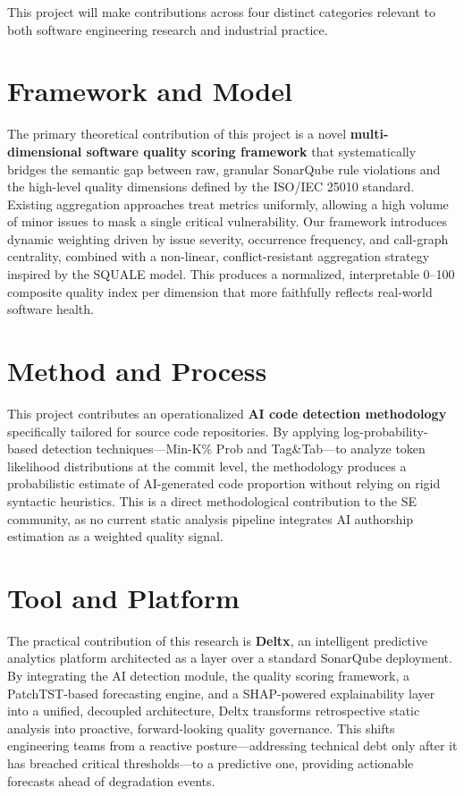 This project will make contributions across four distinct categories relevant to both software engineering research and industrial practice.

\section{Framework and Model}

The primary theoretical contribution of this project is a novel \textbf{multi-dimensional software quality scoring framework} that systematically bridges the semantic gap between raw, granular SonarQube rule violations and the high-level quality dimensions defined by the ISO/IEC 25010 standard. Existing aggregation approaches treat metrics uniformly, allowing a high volume of minor issues to mask a single critical vulnerability. Our framework introduces dynamic weighting driven by issue severity, occurrence frequency, and call-graph centrality, combined with a non-linear, conflict-resistant aggregation strategy inspired by the SQUALE model. This produces a normalized, interpretable 0--100 composite quality index per dimension that more faithfully reflects real-world software health.

\section{Method and Process}

This project contributes an operationalized \textbf{AI code detection methodology} specifically tailored for source code repositories. By applying log-probability-based detection techniques—Min-K\% Prob and Tag\&Tab—to analyze token likelihood distributions at the commit level, the methodology produces a probabilistic estimate of AI-generated code proportion without relying on rigid syntactic heuristics. This is a direct methodological contribution to the SE community, as no current static analysis pipeline integrates AI authorship estimation as a weighted quality signal.

\section{Tool and Platform}

The practical contribution of this research is \textbf{Deltx}, an intelligent predictive analytics platform architected as a layer over a standard SonarQube deployment. By integrating the AI detection module, the quality scoring framework, a PatchTST-based forecasting engine, and a SHAP-powered explainability layer into a unified, decoupled architecture, Deltx transforms retrospective static analysis into proactive, forward-looking quality governance. This shifts engineering teams from a reactive posture—addressing technical debt only after it has breached critical thresholds—to a predictive one, providing actionable forecasts ahead of degradation events.

